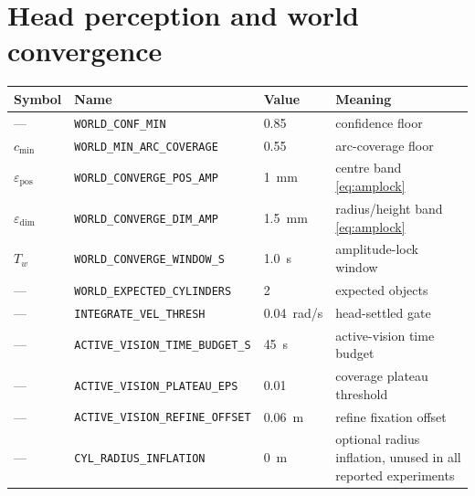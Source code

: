 \documentclass[12pt,a4paper,twoside,openright]{report}
\begin{document}
\section{Head perception and world convergence}
\begin{tabularx}{\linewidth}{@{}lllX@{}}
\toprule
Symbol & Name & Value & Meaning \\
\midrule
--- & \texttt{WORLD\_CONF\_MIN} & 0.85 & confidence floor \\
$c_{\min}$ & \texttt{WORLD\_MIN\_ARC\_COVERAGE} & 0.55 & arc-coverage floor \\
$\varepsilon_{\text{pos}}$ & \texttt{WORLD\_CONVERGE\_POS\_AMP} & 1~mm & centre band \eqref{eq:amplock} \\
$\varepsilon_{\text{dim}}$ & \texttt{WORLD\_CONVERGE\_DIM\_AMP} & 1.5~mm & radius/height band \eqref{eq:amplock} \\
$T_w$ & \texttt{WORLD\_CONVERGE\_WINDOW\_S} & 1.0~s & amplitude-lock window \\
--- & \texttt{WORLD\_EXPECTED\_CYLINDERS} & 2 & expected objects \\
--- & \texttt{INTEGRATE\_VEL\_THRESH} & 0.04~rad/s & head-settled gate \\
--- & \texttt{ACTIVE\_VISION\_TIME\_BUDGET\_S} & 45~s & active-vision time budget \\
--- & \texttt{ACTIVE\_VISION\_PLATEAU\_EPS} & 0.01 & coverage plateau threshold \\
--- & \texttt{ACTIVE\_VISION\_REFINE\_OFFSET} & 0.06~m & refine fixation offset \\
--- & \texttt{CYL\_RADIUS\_INFLATION} & 0~m & optional radius inflation, unused in all reported experiments \\
\bottomrule
\end{tabularx}
\end{document}
